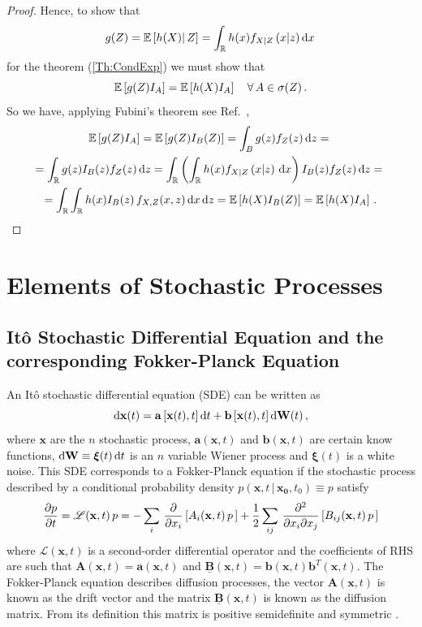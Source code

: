 \documentclass[10pt,a4paper]{book}
\theoremstyle{definition}
\begin{document}
\begin{appendices}
\begin{proof}
\noindent
Hence, to show that 
$$
g(Z)=\mathbb{E}\left[ {h(X)} \middle\vert {\,Z} \right]=\int_{\mathbb{R}} h(x) f_{X\lvert Z}\left(x\lvert z\right)  \mbox{d} x\,
$$
for the theorem (\ref{Th:CondExp}) we must show that
$$
\mathbb{E}\left[ g(Z)I_{A} \right]=\mathbb{E}\left[ h(X)I_{A} \right]\quad\forall\,A\in\sigma(Z)\,.
$$
So we have, applying Fubini's theorem see Ref.~\cite[p.~77-79]{Williams1991},
\begin{multline*}
\mathbb{E}\left[ g(Z)I_{A} \right]=\mathbb{E}\left[ g(Z)I_B(Z) \right] = \int_B g(z)f_Z(z)\,\mbox{d} z ={}\\ 
 = \int_{\mathbb{R}} g(z)I_B(z)f_Z(z)\,\mbox{d} z =\int_{\mathbb{R}}\left(\int_{\mathbb{R}} h(x) f_{X\lvert Z}\left(x\lvert z\right)\,\mbox{d} x\right)I_B(z)f_Z(z) \,\mbox{d} z ={}\\
   = \int_{\mathbb{R}}\int_{\mathbb{R}} h(x)I_B(z)\,f_{X,Z}(x,z)\,\mbox{d} x\,\mbox{d} z = \mathbb{E}\left[ h(X)I_B(Z) \right]=\mathbb{E}\left[ h(X)I_{A} \right]\,.
\end{multline*}

\end{proof}


\chapter{Elements of Stochastic Processes}
\label{App:B}
\section{It\^o Stochastic Differential Equation and the corresponding Fokker-Planck Equation}
\label{Sec:SDE}
An It\^o stochastic differential equation (SDE) can be written as
\[
  \mbox{d} \mathbf{x}(t) = \mathbf{a} \left[\mathbf{x}(t),t\right] \mbox{d} t+\mathbf{b}\left[\mathbf{x}(t),t\right] \mbox{d} \mathbf{W}(t)\,,
\]
where $\mathbf{x}$ are the $n$ stochastic process, $\mathbf{a}(\mathbf{x},t)$ and $\mathbf{b}(\mathbf{x},t)$ are certain know functions, 
$ \mbox{d} \mathbf{W}\equiv \boldsymbol{\xi}(t)\,\mbox{d} t $ is an $n$ variable Wiener process and $\boldsymbol{\xi}(t)$ is a white noise. This SDE corresponds to a Fokker-Planck equation if the stochastic process described by a conditional probability density $p(\mathbf{x},t\,|\,\mathbf{x_0},t_0)\equiv p$ satisfy 
\[
  \frac{\partial p}{\partial t} = \mathscr{L}(\mathbf{x},t)\,p
     =-\sum_i\,\frac{\partial}{\partial x_i}\left[ A_i(\mathbf{x},t)\,p\, \right]
      +\frac{1}{2}\sum_{ij}\,\frac{\partial^2}{\partial x_i \partial x_j} \left[ B_{ij}(\mathbf{x},t)\,p\, \right] 
\]
where $\mathscr{L}(\mathbf{x},t)$ is a second-order differential operator and the coefficients of RHS are such that $\mathbf{A}(\mathbf{x},t)=\mathbf{a}(\mathbf{x},t)$ and $\underline{\mathbf{B}}(\mathbf{x},t)=\mathbf{b}(\mathbf{x},t)\textbf{b}^T(\mathbf{x},t)$. The Fokker-Planck equation describes diffusion processes, the vector $\mathbf{A}(\mathbf{x},t)$ is known as the drift vector and the matrix $\underline{\mathbf{B}}(\mathbf{x},t)$ is known as the diffusion matrix. From its definition this matrix is positive semidefinite and symmetric \cite{Gardiner2009}.


\end{appendices}
\end{document}
